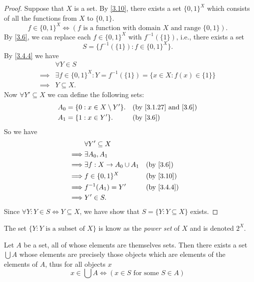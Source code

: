 \begin{proof}
  Suppose that \(X\) is a set.
  By \cref{3.10}, there exists a set \(\{0, 1\}^X\) which consists of all the functions from \(X\) to \(\{0, 1\}\).
  \[
    f \in \{0, 1\}^X \iff (f \text{ is a function with domain } X \text{ and range } \{0, 1\}).
  \]
  By \cref{3.6}, we can replace each \(f \in \{0, 1\}^X\) with \(f^{-1}(\{1\})\), i.e., there exists a set
  \[
    S = \{f^{-1}(\{1\}) : f \in \{0, 1\}^X\}.
  \]
  By \cref{3.4.4} we have
  \begin{align*}
             & \forall Y \in S                                                             \\
    \implies & \exists f \in \{0, 1\}^X : Y = f^{-1}(\{1\}) = \{x \in X : f(x) \in \{1\}\} \\
    \implies & Y \subseteq X.
  \end{align*}
  Now \(\forall Y' \subseteq X\) we can define the following sets:
  \begin{align*}
    A_0 & = \{0 : x \in X \setminus Y'\}. &  & \text{(by \cref{3.1.27} and \cref{3.6})} \\
    A_1 & = \{1 : x \in Y'\}.             &  & \text{(by \cref{3.6})}
  \end{align*}
  So we have
  \begin{align*}
             & \forall Y' \subseteq X                                      \\
    \implies & \exists A_0, A_1                                            \\
    \implies & \exists f : X \to A_0 \cup A_1 &  & \text{(by \cref{3.6})}  \\
    \implies & f \in \{0, 1\}^X               &  & \text{(by \cref{3.10})} \\
    \implies & f^{-1}(A_1) = Y'               &  & \by{3.4.4}              \\
    \implies & Y' \in S.
  \end{align*}
  Since \(\forall Y : Y \in S \iff Y \subseteq X\), we have show that \(S = \{Y : Y \subseteq X\}\) exists.
\end{proof}

\begin{rmk}\label{3.4.10}
  The set \(\{Y : Y \text{ is a subset of } X\}\) is know as the \emph{power set} of \(X\) and is denoted \(2^X\).
\end{rmk}

\begin{ax}[Union]\label{3.11}
  Let \(A\) be a set, all of whose elements are themselves sets.
  Then there exists a set \(\bigcup A\) whose elements are precisely those objects which are elements of the elements of \(A\), thus for all objects \(x\)
  \[
    x \in \bigcup A \iff (x \in S \text{ for some } S \in A)
  \]
\end{ax}

